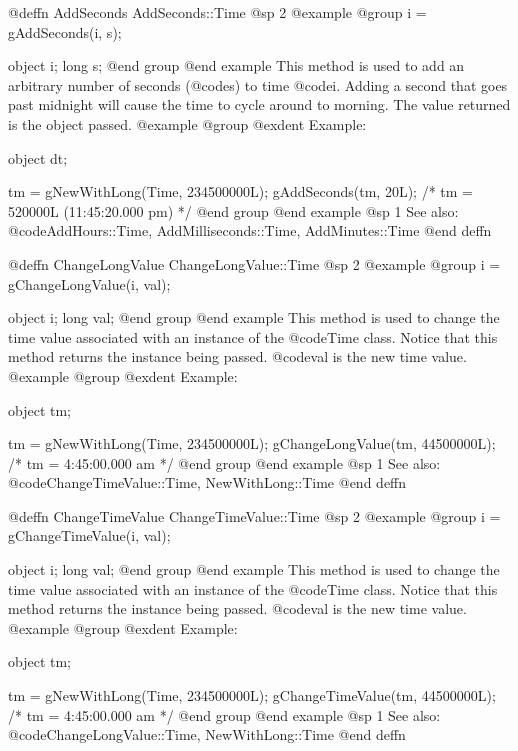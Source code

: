 @deffn {AddSeconds} AddSeconds::Time
@sp 2
@example
@group
i = gAddSeconds(i, s);

object  i;
long    s;
@end group
@end example
This method is used to add an arbitrary number of seconds (@code{s}) to
time @code{i}.  Adding a second that goes past midnight will cause the time
to cycle around to morning.  The value returned is the object passed.
@example
@group
@exdent Example:

object  dt;

tm = gNewWithLong(Time, 234500000L);
gAddSeconds(tm, 20L);  /* tm = 520000L (11:45:20.000 pm) */
@end group
@end example
@sp 1
See also:  @code{AddHours::Time, AddMilliseconds::Time, AddMinutes::Time}
@end deffn










@deffn {ChangeLongValue} ChangeLongValue::Time
@sp 2
@example
@group
i = gChangeLongValue(i, val);

object  i;
long    val;
@end group
@end example
This method is used to change the time value associated with an 
instance of the @code{Time} class.  Notice that this method
returns the instance being passed.  @code{val} is the new time value.
@example
@group
@exdent Example:

object  tm;

tm = gNewWithLong(Time, 234500000L);
gChangeLongValue(tm, 44500000L);   /*  tm = 4:45:00.000 am  */
@end group
@end example
@sp 1
See also:  @code{ChangeTimeValue::Time, NewWithLong::Time}
@end deffn










@deffn {ChangeTimeValue} ChangeTimeValue::Time
@sp 2
@example
@group
i = gChangeTimeValue(i, val);

object  i;
long    val;
@end group
@end example
This method is used to change the time value associated with an 
instance of the @code{Time} class.  Notice that this method
returns the instance being passed.  @code{val} is the new time value.
@example
@group
@exdent Example:

object  tm;

tm = gNewWithLong(Time, 234500000L);
gChangeTimeValue(tm, 44500000L);   /*  tm = 4:45:00.000 am  */
@end group
@end example
@sp 1
See also:  @code{ChangeLongValue::Time, NewWithLong::Time}
@end deffn










